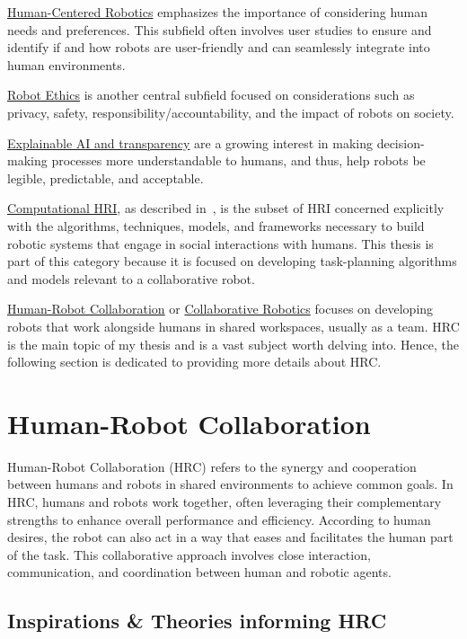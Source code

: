 \uline{Human-Centered Robotics} emphasizes the importance of considering human needs and preferences. This subfield often involves user studies to ensure and identify if and how robots are user-friendly and can seamlessly integrate into human environments.

\uline{Robot Ethics} is another central subfield focused on considerations such as privacy, safety, responsibility/accountability, and the impact of robots on society.

\uline{Explainable AI and transparency} are a growing interest in making decision-making processes more understandable to humans, and thus, help robots be legible, predictable, and acceptable.

\uline{Computational HRI}, as described in~\cite{thomaz_computational_2016}, is the subset of HRI concerned explicitly with the algorithms, techniques, models, and frameworks necessary to build robotic systems that engage in social interactions with humans. This thesis is part of this category because it is focused on developing task-planning algorithms and models relevant to a collaborative robot. 

\uline{Human-Robot Collaboration} or \uline{Collaborative Robotics} focuses on developing robots that work alongside humans in shared workspaces, usually as a team. HRC is the main topic of my thesis and is a vast subject worth delving into. Hence, the following section is dedicated to providing more details about HRC.

\section{Human-Robot Collaboration}

Human-Robot Collaboration (HRC) refers to the synergy and cooperation between humans and robots in shared environments to achieve common goals. In HRC, humans and robots work together, often leveraging their complementary strengths to enhance overall performance and efficiency. According to human desires, the robot can also act in a way that eases and facilitates the human part of the task. This collaborative approach involves close interaction, communication, and coordination between human and robotic agents.

\subsection{Inspirations \& Theories informing HRC}

